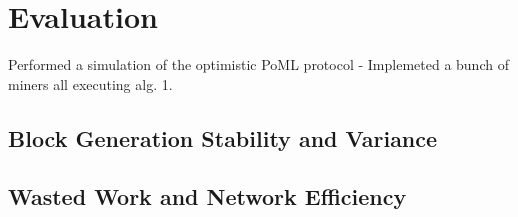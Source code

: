 \section{Evaluation}
\label{sec:experiments}
Performed a simulation of the optimistic PoML protocol - 
Implemeted a bunch of miners all executing alg. 1.


\subsection{Block Generation Stability and Variance}


\subsection{Wasted Work and Network Efficiency}



